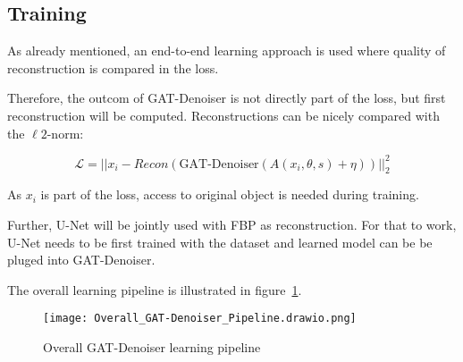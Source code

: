 \subsection{Training}

As already mentioned, an end-to-end learning approach is used where quality of reconstruction is 
compared in the loss.

Therefore, the outcom of GAT-Denoiser is not directly part of the loss, but first reconstruction will be computed.
Reconstructions can be nicely compared with the $\ell2$-norm:

\begin{equation}
  \mathcal{L} = || x_i - Recon ( \text{GAT-Denoiser}(A(x_i, \theta, s) + \eta)) ||^2_2
\end{equation}

As $x_i$ is part of the loss, access to original object is needed during training.

Further, U-Net will be jointly used with FBP as reconstruction. For that to work, U-Net needs to be 
first trained with the dataset and learned model can be be pluged into GAT-Denoiser.

The overall learning pipeline is illustrated in figure~\ref{fig:pipeline-overall}.

\begin{figure}[H]
  \centering
  \label{fig:pipeline-overall}
  \texttt{[image: Overall\_GAT-Denoiser\_Pipeline.drawio.png]}
  \caption{Overall GAT-Denoiser learning pipeline}
\end{figure}








